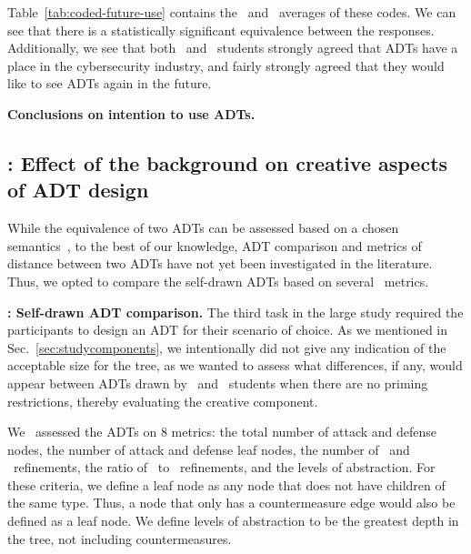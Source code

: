 Table~\ref{tab:coded-future-use} contains the \ICS\ and \SEC\ averages of these codes.
We can see that there is a statistically significant equivalence between the responses. Additionally, we see that both \ICS\ and \SEC\ students strongly agreed that ADTs have a place in the cybersecurity industry, and fairly strongly agreed that they would like to see ADTs again in the future.




\textbf{Conclusions on intention to use ADTs.}





\subsection{: Effect of the background on creative aspects of ADT design}\label{sec:rq4}

While the equivalence of two ADTs can be assessed based on a chosen semantics~\cite{mauwFoundationsAttackTrees2006}, to the best of our knowledge, ADT comparison and metrics of distance between two ADTs have not yet been investigated in the literature. Thus, we opted to compare the self-drawn ADTs based on several \ metrics.

\textbf{\hypothesis{\hypoThirdADT}: Self-drawn ADT comparison.}
The third task in the large study required the participants to design an ADT for their scenario of choice. As we mentioned in Sec.~\ref{sec:studycomponents}, we intentionally did not give any indication of the acceptable size for the tree, as we wanted to assess what differences, if any, would appear between ADTs drawn by \ICS\ and \SEC\ students when there are no priming restrictions, thereby evaluating the creative component.


We \ assessed the ADTs on 8 metrics: the total number of attack and defense nodes, the number of attack and defense leaf nodes, the number of \OR\ and \AND\ refinements, the ratio of \OR\ to \AND\ refinements, and the levels of abstraction. For these criteria, we define a leaf node as any node that does not have children of the same type. Thus, a node that only has a countermeasure edge would also be defined as a leaf node. We define levels of abstraction to be the greatest depth in the tree, not including countermeasures.


